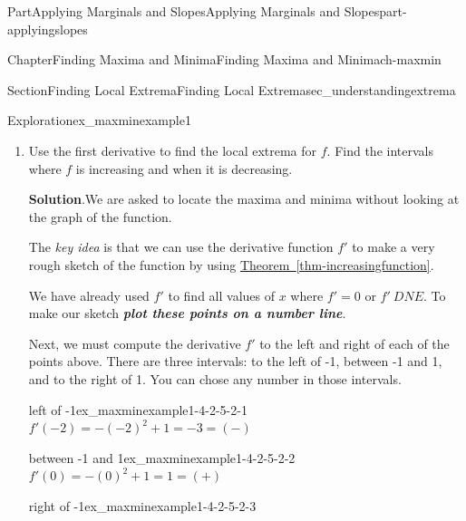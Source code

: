 \documentclass{tufte-book}
\newcommand{\blocktitlefont}{\relax}
\newcommand{\xreffont}{\relax}
\newcommand{\alert}[1]{\textbf{\textit{#1}}}
\numberwithin{equation}{chapter}
\begin{document}
\begin{partptx}{Part}{Applying Marginals and Slopes}{}{Applying Marginals and Slopes}{}{}{part-applyingslopes}
\begin{chapterptx}{Chapter}{Finding Maxima and Minima}{}{Finding Maxima and Minima}{}{}{ch-maxmin}
\begin{sectionptx}{Section}{Finding Local Extrema}{}{Finding Local Extrema}{}{}{sec_understandingextrema}
\begin{exploration}{Exploration}{}{ex_maxminexample1}
\begin{enumerate}[font=\bfseries,label=(\alph*),ref=\alph*]
%
\par
Looking at the graph, we can see that there is a local maxima at \(x=1\) and a local minima at \(x=-1\). We also know that there are no other locations where there \emph{might} be a maxima or minima, even off the screen of the calculator.%
\par
In particular, this tells us that there are \emph{no} absolute maxima or minima.%
\item{}Use the first derivative to find the local extrema for \(f\). Find the intervals where \(f\) is increasing and when it is decreasing.%
\par\smallskip%
\noindent\textbf{\blocktitlefont Solution}.\hypertarget{ex_maxminexample1-4-2}{}\quad{}We are asked to locate the maxima and minima without looking at the graph of the function.%
\par
The \emph{key idea} is that we can use  the derivative function \(f'\) to make a very rough sketch of the function by using \hyperref[thm-increasingfunction]{Theorem~{\xreffont\ref{thm-increasingfunction}}}.%
\par
We have already used \(f'\) to find all values of \(x\) where \(f'=0\) or \(f'\ DNE\). To make our sketch \alert{plot these points on a number line}.%
\par
\begin{image}{0.25}{0.5}{0.25}{}%
%
\end{image}%
%
\par
Next, we must compute the derivative \(f'\) to the left and right of each of the points above. There are three intervals: to the left of -1, between -1 and 1, and to the right of 1.  You can chose any number in those intervals.%
\begin{descriptionlist}
\begin{dlimedium}{left of -1}{ex_maxminexample1-4-2-5-2-1}%
 \(f'(-2) = -(-2)^2 + 1 = -3 = (-)\)\end{dlimedium}%
\begin{dlimedium}{between -1 and 1}{ex_maxminexample1-4-2-5-2-2}%
 \(f'(0) = -(0)^2 + 1 = 1 = (+)\)\end{dlimedium}%
\begin{dlimedium}{right of -1}{ex_maxminexample1-4-2-5-2-3}%

\end{dlimedium}
\end{descriptionlist}
\end{enumerate}
\end{exploration}
\end{sectionptx}
\end{chapterptx}
\end{partptx}
\end{document}
